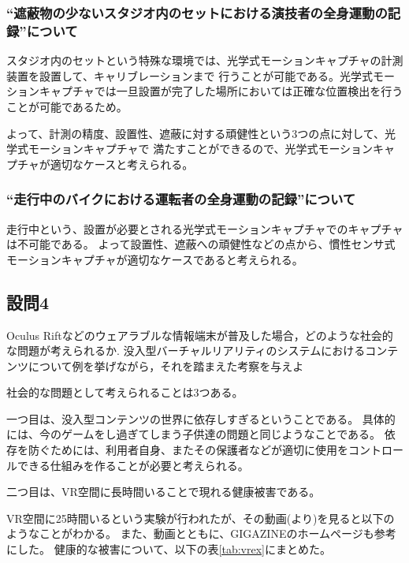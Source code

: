 \documentclass[11pt,a4j]{jsarticle}
\begin{document}
\subsubsection{``遮蔽物の少ないスタジオ内のセットにおける演技者の全身運動の記録''について}

スタジオ内のセットという特殊な環境では、光学式モーションキャプチャの計測装置を設置して、キャリブレーションまで
行うことが可能である。光学式モーションキャプチャでは一旦設置が完了した場所においては正確な位置検出を行うことが可能であるため。

よって、計測の精度、設置性、遮蔽に対する頑健性という3つの点に対して、光学式モーションキャプチャで
満たすことができるので、光学式モーションキャプチャが適切なケースと考えられる。

\subsubsection{``走行中のバイクにおける運転者の全身運動の記録''について}

走行中という、設置が必要とされる光学式モーションキャプチャでのキャプチャは不可能である。
よって設置性、遮蔽への頑健性などの点から、慣性センサ式モーションキャプチャが適切なケースであると考えられる。




\subsection{設問4}
Oculus Riftなどのウェアラブルな情報端末が普及した場合，どのような社会的な問題が考えられるか.
没入型バーチャルリアリティのシステムにおけるコンテンツについて例を挙げながら，それを踏まえた考察を与えよ

社会的な問題として考えられることは3つある。

一つ目は、没入型コンテンツの世界に依存しすぎるということである。
具体的には、今のゲームをし過ぎてしまう子供達の問題と同じようなことである。
依存を防ぐためには、利用者自身、またその保護者などが適切に使用をコントロールできる仕組みを作ることが必要と考えられる。


二つ目は、VR空間に長時間いることで現れる健康被害である。

VR空間に25時間いるという実験が行われたが、その動画(\cite{youtube1}より)を見ると以下のようなことがわかる。
また、動画とともに、GIGAZINEのホームページ\cite{gigazine}も参考にした。
健康的な被害について、以下の表\ref{tab:vrex}にまとめた。
\end{document}
